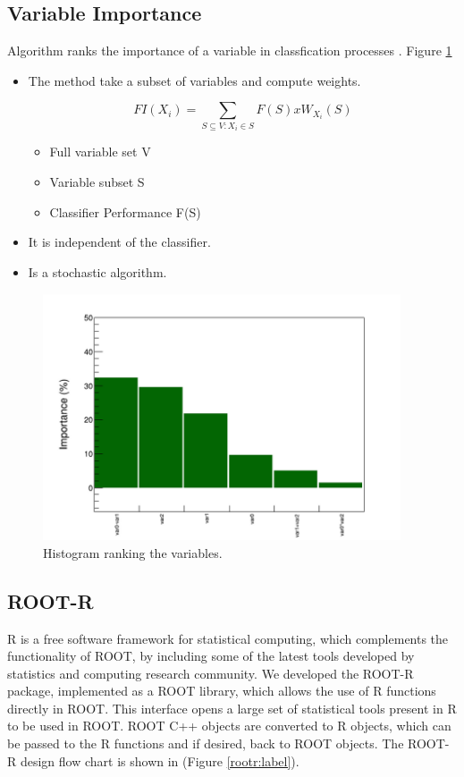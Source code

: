 \documentclass[a4paper]{jpconf}
\begin{document}
\subsection{Variable Importance}
Algorithm ranks the importance of a variable in
classfication processes \cite{gleyzer2008paradigm}. Figure \ref{vi}
\begin{itemize}
\item The method take a subset of variables and compute
weights.

\begin{equation}
FI(X_{i})= \sum_{S\subseteq{V}:X_{i}\in{S}}{F(S)xW_{X_{i}}(S)}
\end{equation}
\begin{itemize}
\item Full variable set {V}
\item Variable subset {S}
\item Classifier Performance F(S)
\end{itemize}
\item It is independent of the classifier.
\item Is a stochastic algorithm.
\end{itemize}

\begin{figure}[h]
\centering
\includegraphics[width=25pc]{img/vi.png}\caption{\label{vi} Histogram ranking the variables.}
\end{figure}



\subsection{ROOT-R}
R  is a free software framework for statistical computing\cite{R}, which complements the functionality of ROOT, by including some of the latest tools developed by statistics and computing research community. 
We developed the ROOT-R package, implemented as a ROOT library, which allows the  use of R functions directly in ROOT.
This interface opens a large set of statistical tools present in R to be used in ROOT. ROOT C++ objects are converted to R objects, which can be passed to the  R functions and if desired, back to ROOT objects. 
The ROOT-R design flow chart is shown in (Figure \ref{rootr:label}). 
\end{document}

